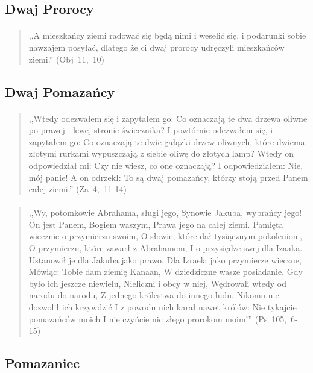 \documentclass[10pt,a4paper,oneside]{article}
\begin{document}
\subsection{Dwaj Prorocy}
\paragraph{}
\begin{quote}
,,A mieszkańcy ziemi radować się będą nimi i weselić się, i podarunki sobie nawzajem posyłać, dlatego że ci dwaj prorocy udręczyli mieszkańców ziemi.'' \mbox{(Obj 11, 10)}
\end{quote}
\subsection{Dwaj Pomazańcy}
\paragraph{}
\begin{quote}
,,Wtedy odezwałem się i zapytałem go: Co oznaczają te dwa drzewa oliwne po prawej i lewej stronie świecznika? I powtórnie odezwałem się, i zapytałem go: Co oznaczają te dwie gałązki drzew oliwnych, które dwiema złotymi rurkami wypuszczają z siebie oliwę do złotych lamp? Wtedy on odpowiedział mi: Czy nie wiesz, co one oznaczają? I odpowiedziałem: Nie, mój panie! A on odrzekł: To są dwaj pomazańcy, którzy stoją przed Panem całej ziemi.'' \mbox{(Za 4, 11-14)}
\end{quote}
\paragraph{}
\begin{quote}
,,Wy, potomkowie Abrahama, sługi jego, Synowie Jakuba, wybrańcy jego! On jest Panem, Bogiem waszym, Prawa jego na całej ziemi. Pamięta wiecznie o przymierzu swoim, O słowie, które dał tysiącznym pokoleniom, O przymierzu, które zawarł z Abrahamem, I o przysiędze swej dla Izaaka. Ustanowił je dla Jakuba jako prawo, Dla Izraela jako przymierze wieczne, Mówiąc: Tobie dam ziemię Kanaan, W dziedziczne wasze posiadanie. Gdy było ich jeszcze niewielu, Nieliczni i obcy w niej, Wędrowali wtedy od narodu do narodu, Z jednego królestwa do innego ludu. Nikomu nie dozwolił ich krzywdzić I z powodu nich karał nawet królów: Nie tykajcie pomazańców moich I nie czyńcie nic złego prorokom moim!'' \mbox{(Ps 105, 6-15)}
\end{quote}
\subsection{Pomazaniec}
\end{document}
